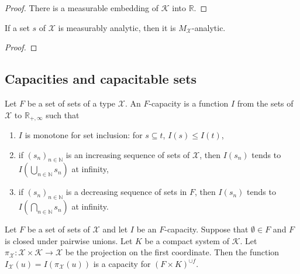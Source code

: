 \begin{proof}\leanok
There is a measurable embedding of $\mathcal{K}$ into $\mathbb{R}$.
\end{proof}


\begin{lemma}\label{lem:IsMeasurableAnalytic.isPavingAnalytic}
  \leanok
If a set $s$ of $\mathcal{X}$ is measurably analytic, then it is $M_{\mathcal{X}}$-analytic.
\end{lemma}

\begin{proof}\leanok

\end{proof}



\subsection{Capacities and capacitable sets}

\begin{definition}\label{def:Capacity}
  \leanok
Let $F$ be a set of sets of a type $\mathcal{X}$.
An $F$-capacity is a function $I$ from the sets of $\mathcal{X}$ to $\mathbb{R}_{+,\infty}$ such that
\begin{enumerate}
  \item $I$ is monotone for set inclusion: for $s \subseteq t$, $I(s) \le I(t)$,
  \item if $(s_n)_{n\in\mathbb{N}}$ is an increasing sequence of sets of $\mathcal{X}$, then $I(s_n)$ tends to $I(\bigcup_{n\in\mathbb{N}} s_n)$ at infinity,
  \item if $(s_n)_{n\in\mathbb{N}}$ is a decreasing sequence of sets in $F$, then $I(s_n)$ tends to $I(\bigcap_{n\in\mathbb{N}} s_n)$ at infinity.
\end{enumerate}
\end{definition}


\begin{lemma}\label{lem:Capacity.comp_fst_aux}
  \leanok
Let $F$ be a set of sets of $\mathcal{X}$ and let $I$ be an $F$-capacity.
Suppose that $\emptyset \in F$ and $F$ is closed under pairwise unions.
Let $K$ be a compact system of $\mathcal{K}$.
Let $\pi_{\mathcal{X}} : \mathcal{X} \times \mathcal{K} \to \mathcal{X}$ be the projection on the first coordinate.
Then the function $I_{\mathcal{X}}(u) = I(\pi_{\mathcal{X}}(u))$ is a capacity for $(F \times K)^{\cup f}$.
\end{lemma}

